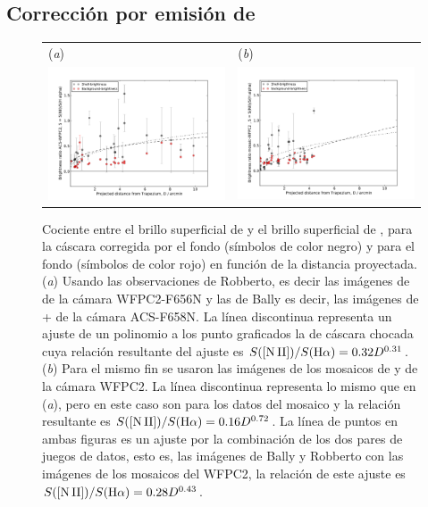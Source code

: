\subsection{Corrección por emisión de \nii{}}
\label{sec:comp}

\begin{figure}[htp]
\centering
\begin{tabular}{l l}
(\textit{a}) & (\textit{b})  \\
  \includegraphics[width=0.48\linewidth, trim=20 9.5 50 20, clip]{./acs_wfpc2-ratio-Nii_ha-vs-D_-mean-error_new}
& \includegraphics[width=0.48\linewidth, trim=20 9.5 50 20, clip]{./wfpc2-mosaic-ratio-Nii_ha-vs-D_-mean-error_new}\\
\end{tabular}
\caption{Cociente entre el brillo superficial de \nii{} y el brillo superficial de \ha{}, para la cáscara corregida por el fondo (símbolos de color negro) y para el fondo (símbolos de color rojo) en función de la distancia proyectada. (\textit{a}) Usando las observaciones de Robberto, es decir las imágenes de \ha{} de la cámara WFPC2-F656N y las de Bally es decir, las imágenes de \ha{}+\nii{} de la cámara ACS-F658N. La línea discontinua representa un ajuste de un polinomio a los punto graficados la de cáscara chocada cuya relación resultante del ajuste es \(S(\mathrm{[N\,II]}{})/S(\mathrm{H}\alpha{})=0.32D^{0.31}\). (\textit{b}) Para el mismo fin se usaron las imágenes de los mosaicos de \ha{} y \nii{} de la cámara WFPC2. La línea discontinua representa lo mismo que en (\textit{a}), pero en este caso son para los datos del mosaico y la relación resultante es \(S(\mathrm{[N\,II]}{})/S(\mathrm{H}\alpha{})=0.16D^{0.72}\). La línea de puntos en ambas figuras es un  ajuste  por la combinación de los dos pares de juegos de datos, esto es, las imágenes de Bally y Robberto con las imágenes de los mosaicos del WFPC2, la relación de este ajuste es \(S(\mathrm{[N\,II]}{})/S(\mathrm{H}\alpha{})=0.28D^{0.43}\).}\label{fig:ratio-nii-ha}
\end{figure}

